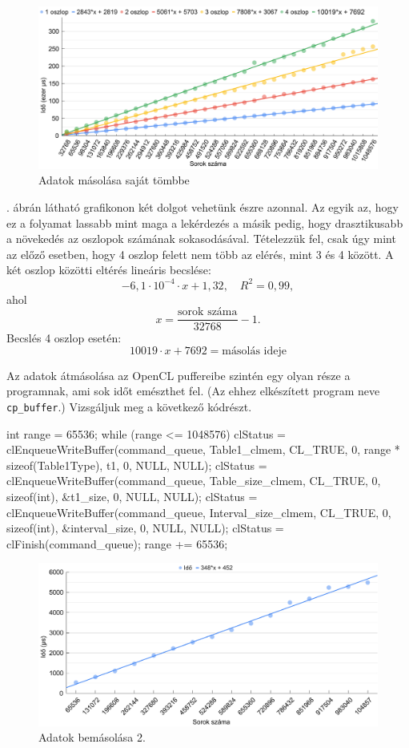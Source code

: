 \begin{figure}[h!]
\centering
\includegraphics[width=\textwidth]{images/graph/ccopy.png}
\caption{Adatok másolása saját tömbbe}
\label{fig:ccopy}
\end{figure}

. ábrán látható grafikonon két dolgot vehetünk észre azonnal. Az egyik az, hogy ez a folyamat lassabb mint maga a lekérdezés a másik pedig, hogy drasztikusabb a növekedés az oszlopok számának sokasodásával.
Tételezzük fel, csak úgy mint az előző esetben, hogy 4 oszlop felett nem több az elérés, mint 3 és 4 között.
A két oszlop közötti eltérés lineáris becslése:
$$-6,1 \cdot 10^{-4} \cdot x + 1,32, \quad R^2=0,99,$$ 
ahol
$$x = \dfrac{\text{sorok száma}}{32768} - 1.$$
Becslés 4 oszlop esetén:
$$ 10019 \cdot x + 7692 = \text{másolás ideje}$$


Az adatok átmásolása az OpenCL puffereibe szintén egy olyan része a programnak, ami sok időt emészthet fel.
(Az ehhez elkészített program neve \texttt{cp\_buffer}.)
Vizsgáljuk meg a következő kódrészt.
\begin{python}
int range = 65536;
while (range <= 1048576)
{
 clStatus = clEnqueueWriteBuffer(command_queue, Table1_clmem,
  CL_TRUE, 0, range * sizeof(Table1Type), t1, 0, NULL, NULL);
 clStatus = clEnqueueWriteBuffer(command_queue, Table_size_clmem,
  CL_TRUE, 0, sizeof(int), &t1_size, 0, NULL, NULL);
 clStatus = clEnqueueWriteBuffer(command_queue, Interval_size_clmem,
  CL_TRUE, 0, sizeof(int), &interval_size, 0, NULL, NULL);
 clStatus = clFinish(command_queue);
 range += 65536;
}
\end{python}

\begin{figure}[h!]
\centering
\includegraphics[width=\textwidth]{images/graph/pufferin.png}
\caption{Adatok bemásolása 2.}
\label{fig:pufferin}
\end{figure}

